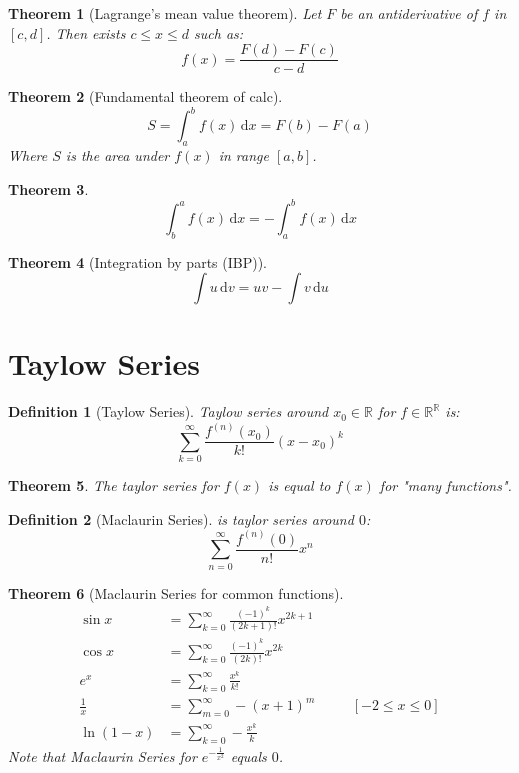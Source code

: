 \documentclass[]{article}
\newtheorem{theorem}{Theorem}[section]
\newtheorem{definition}{Definition}[section]
\newcommand\R     {\mathbb{R}}
\newcommand\cosx  {\cos x}
\newcommand\sinx  {\sin x}
\newcommand\dx    {\,\mathrm{d}x}
\newcommand\du    {\,\mathrm{d}u}
\newcommand\dv    {\,\mathrm{d}v}
\renewcommand\inf {\infty}
\begin{document}
\begin{multicols}{2}
		\begin{theorem}[Lagrange's mean value theorem]
			Let $F$ be an antiderivative of $f$ in $[c, d]$. Then exists $c \le x \le d$ such as: 
			\[ f(x) = \frac{F(d) - F(c)}{c - d} \]
		\end{theorem}
		
		\begin{theorem}[Fundamental theorem of calc]
			\[ S = \int^b_a f(x)\dx = F(b) - F(a) \]
			Where $S$ is the area under $f(x)$ in range $[a, b]$. 
		\end{theorem}
		
		\begin{theorem}
			\[ \int^a_b f(x) \dx = -\int^b_a f(x) \dx \]
		\end{theorem}
		
		\begin{theorem}[Integration by parts (IBP)]
			\[ \int u\dv = uv - \int v\du \]
		\end{theorem}
		
		
		\section{Taylow Series}
		
		\begin{definition}[Taylow Series]
			Taylow series around $x_0 \in \R$ for $f \in \R^\R$ is: 
			\[ \sum_{k = 0}^{\inf}\frac{f^{(n)}(x_0)}{k!}(x - x_0)^k \]
		\end{definition}
		
		\begin{theorem}
			The taylor series for $f(x)$ is equal to $f(x)$ for "many functions". 
		\end{theorem}
		
		\begin{definition}[Maclaurin Series] is taylor series around $0$:
			\[ \sum_{n = 0}^{\inf}\frac{f^{(n)}(0)}{n!}x^n \]
		\end{definition}
		
		\begin{theorem}[Maclaurin Series for common functions]
			\begin{alignat*}{9}
				\sinx &= \sum_{k = 0}^{\inf}\frac{(-1)^k}{(2k + 1)!}x^{2k + 1} \\
				\cosx &= \sum_{k = 0}^{\inf}\frac{(-1)^k}{(2k)!}x^{2k} \\
				e^x &= \sum_{k = 0}^{\inf}\frac{x^k}{k!} \\
				\frac{1}{x} &= \sum_{m = 0}^{\inf}-(x + 1)^m && \quad [-2 \le x \le 0] \\
				\ln(1 - x) &= \sum_{k = 0}^{\inf} -\frac{x^k}{k}
			\end{alignat*}
			Note that Maclaurin Series for $e^{-\frac{1}{x^2}}$ equals $0$. 
		\end{theorem}
		

\end{multicols}
\end{document}

